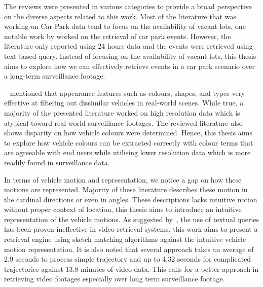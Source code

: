 The reviews were presented in various categories to provide a broad perspective on the diverse aspects related to this work. 
Most of the literature that was working on Car Park data tend to focus on the availability of vacant lots, one notable work by  worked on the retrieval of car park events. However, the literature only reported using 24 hours data and the events were retrieved using text based query. Instead of focusing on the availability of vacant lots, this thesis aims to explore how we can effectively retrieve events in a car park scenario over a long-term surveillance footage.

~ mentioned that appearance features such as colours, shapes, and types very effective at filtering out dissimilar vehicles in real-world scenes. 
While true, a majority of the presented literature worked on high resolution data which is atypical toward real-world surveillance footages.
The reviewed literature also shows disparity on how vehicle colours were determined.
Hence, this thesis aims to explore how vehicle colours can be extracted correctly with colour terms that are agreeable with end users while utilising lower resolution data which is more readily found in surveillance data.

In terms of vehicle motion and representation, we notice a gap on how these motions are represented. Majority of these literature describes these motion in the cardinal directions or even in angles. These descriptions lacks intuitive notion without proper context of location, this thesis aims to introduce an intuitive representation of the vehicle motions.
As suggested by~\cite{bhaumik2016hybrid}, the use of textual queries has been proven ineffective in video retrieval systems, this work aims to present a retrieval engine using sketch matching algorithms against the intuitive vehicle motion representation. It is also noted that several approach takes an average of 2.9 seconds to process simple trajectory and up to 4.32 seconds for complicated trajectories against 13.8 minutes of video data. This calls for a better approach in retrieving video footages especially over long term surveillance footage.


%

